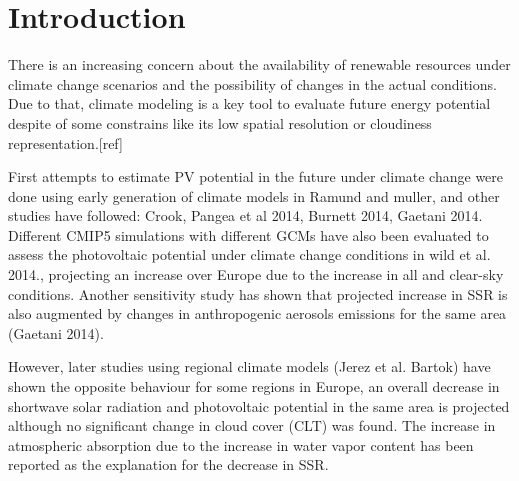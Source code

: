 \section{Introduction}


  There is an increasing concern about the availability of renewable resources under climate change scenarios and the possibility of changes in the actual conditions. Due to that, climate modeling is a key tool to evaluate future energy potential despite of some constrains like its low spatial resolution or cloudiness representation.[ref]
   


First attempts to estimate PV potential in the future under climate change were done using early generation of climate models in Ramund and muller, and other studies have followed: Crook, Pangea et al 2014, Burnett 2014, Gaetani 2014. Different CMIP5 simulations with different GCMs have also been evaluated to assess the photovoltaic potential under climate change conditions in wild et al. 2014., projecting an increase over Europe due to the increase in all and clear-sky conditions. Another sensitivity study has shown that projected increase in SSR is also augmented by changes in anthropogenic aerosols emissions for the same area (Gaetani 2014).

  However, later studies using regional climate models (Jerez et al. Bartok) have shown the opposite behaviour for some regions in Europe, an overall decrease in shortwave solar radiation and photovoltaic potential in the same area is projected although no significant change in cloud cover (CLT) was found. The increase in atmospheric absorption due to the increase in water vapor content has been reported as the explanation for the decrease in SSR.
   
